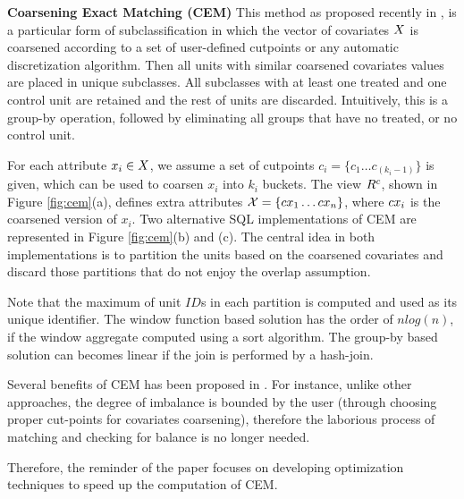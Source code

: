 
{\bf Coarsening Exact Matching (CEM)} This method as proposed
recently in \cite{IacKinPor09},  is a particular form of subclassification in which the vector of covariates ${{X}}$ is
coarsened according to a set of user-defined cutpoints or any
automatic discretization algorithm.  Then all units with similar
coarsened covariates values are placed in unique subclasses. All
subclasses with at least one treated and one control unit are retained
and the rest of units are discarded.  Intuitively, this is a group-by
operation, followed by eliminating all groups that have no treated, or
no control unit. 

For each attribute $x_i \in {{X}}$, we assume a set of cutpoints
$c_i=\{c_{1} \ldots c_{(k_i-1)}\}$ is given, which can be used to
coarsen $x_i$ into $k_i$ buckets. The view ${{R}^c}$, shown in Figure
\ref{fig:cem}(a), defines extra attributes
${{\mathcal{X}}}=\{{{{cx}}}_1 \ldots {{{cx}}}_n\}$, where ${{{cx}}}_i$ is the coarsened
version of $x_i$. Two alternative SQL implementations of CEM are
represented in Figure \ref{fig:cem}(b) and (c).  The central idea in
both implementations is to partition the units based on the coarsened
covariates and discard those partitions that do not enjoy the overlap assumption.  Note that the maximum of unit
$ID$s in each partition is computed and used as its unique
identifier. The window function based solution has the order of
$nlog(n)$, if the window aggregate computed using a sort
algorithm. The group-by based solution can becomes linear if the join
is performed by a hash-join.


Several benefits of CEM has been proposed in \cite{IacKinPor09}. For
instance, unlike other approaches, the degree of imbalance is bounded
by the user (through choosing proper cut-points for covariates
coarsening), therefore the laborious process of matching and checking
for balance is no longer needed.   Therefore, the reminder of the paper focuses on
developing optimization techniques to speed up the computation of
CEM.


\vspace{-2mm} 